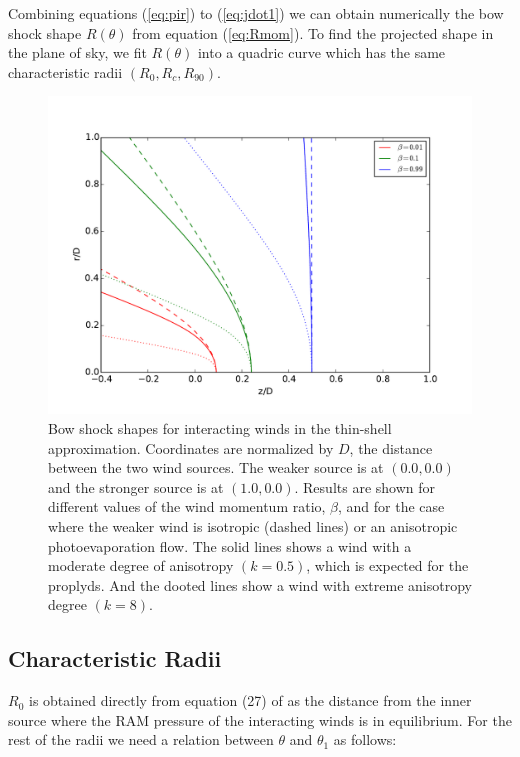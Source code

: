 Combining equations  (\ref{eq:pir}) to (\ref{eq:jdot1}) we can obtain numerically the bow shock shape $R(\theta)$ from equation (\ref{eq:Rmom}).
To find the projected shape in the plane of sky, we fit $R(\theta)$ into a quadric curve which has the same characteristic radii $(R_0,R_c,R_{90})$. 

\begin{figure}
\includegraphics[width=\linewidth]{r-beta}
\caption{Bow shock shapes for interacting winds in the thin-shell
  approximation. Coordinates are normalized by $D$, the distance
  between the two wind sources.  The weaker source is at \((0.0, 0.0)\)
  and the stronger source is at \((1.0, 0.0)\).  Results are shown for
  different values of the wind momentum ratio, \(\beta\), and for the
  case where the weaker wind is isotropic (dashed lines) or an
  anisotropic photoevaporation flow. The solid lines shows a wind with a
  moderate degree of anisotropy $(k=0.5)$, which is expected for the proplyds.
  And the dooted lines show a wind with extreme anisotropy degree $(k=8)$.}
\label{fig:r-beta}
\end{figure}


\subsection{Characteristic Radii}
$R_0$ is obtained directly from equation (27) of \CRW{} as the distance from the inner source where the RAM pressure of the interacting winds is in equilibrium.
For the rest of the radii we need a relation between $\theta$ and $\theta_1$ as follows:


